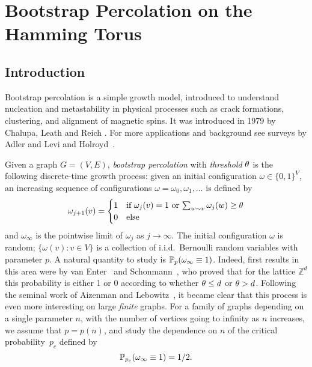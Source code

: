 \chapter{Bootstrap Percolation on the Hamming Torus}
\label{chap:bootstrap}

\section{Introduction}

 \newcommand{\note}[1]{{\bf \textcolor{blue}
{[#1\marginpar{\textcolor{red}{***}}]}}}
\newcommand{\bfit}[1]
{\emph{\textbf{#1}}}

Bootstrap percolation is a simple growth model, introduced to understand nucleation and metastability in physical processes such as crack formations, clustering, and alignment of magnetic
spins. It was introduced in 1979 by Chalupa, Leath and Reich \cite{bethe}. For more applications and background see surveys by Adler and Levi \cite{brazil} and Holroyd~\cite{holroyd-survey}.

Given a graph $G=(V,E)$, {\it bootstrap percolation\/} with {\it threshold\/} $\theta$
is the following discrete-time growth process: given an initial configuration $\omega \in
\{0,1\}^V$, an increasing sequence of configurations 
$\omega=\omega_0,\omega_1,\ldots$ is defined by
$$
\omega_{j+1}(v)=
\begin{cases}
1& \text{if $\omega_j(v)=1$ or $\sum_{w \sim  v}\omega_j(w) \geq
\theta$}\\
0 &\text{else}
\end{cases}
$$
and $\omega_\infty$ is the pointwise limit of $\omega_j$ as $j\to\infty$.
The initial configuration $\omega$ is random; $\{\omega(v): v \in V\}$ is a collection of i.i.d.\ Bernoulli random variables with parameter $p$. A natural quantity to study is $\mathbb{P}_{p}(\omega_\infty\equiv 1)$. Indeed, first results in this area were by van Enter~\cite{vanenter} and Schonmann~\cite{schonmann}, who proved that for the lattice $\mathbb{Z}^d$ this probability is either 1 or 0 according to whether $\theta \le d$ or $\theta > d$. Following the seminal work of Aizenman and Lebowitz~\cite{aizenman},
it became clear that this process is even more interesting on large {\em finite} graphs.  For a family of graphs depending on a single parameter $n$, with the number of vertices going to infinity as $n$ increases, we assume that $p=p(n)$, and study the dependence on $n$ of the critical probability~$p_c$ defined by
\begin{equation*}
\mathbb{P}_{p_c}(\omega_\infty\equiv1)=1/2.
\end{equation*}

